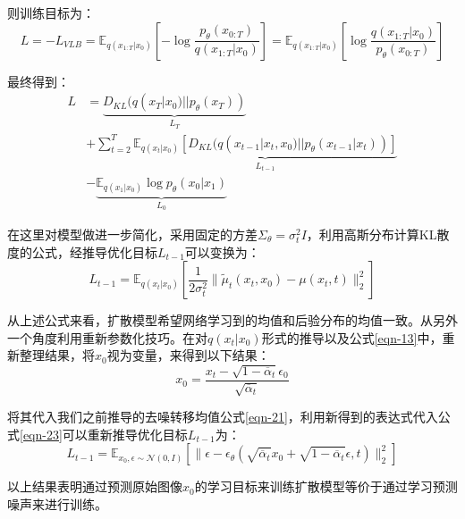 \par
则训练目标为：
\begin{equation}\label{eqn-22}
L = - L_{VLB} = \mathbb{E}_{q(x_{1:T}|x_0)}[-\log{\frac{p_{\theta}(x_{0:T})}{q(x_{1:T}|x_0)}}] = \mathbb{E}_{q(x_{1:T}|x_0)}[\log{\frac{q(x_{1:T}|x_0)}{p_{\theta}(x_{0:T})}}]
\end{equation}
\par
最终得到：
\begin{align}
      L &= \underbrace{D_{KL}(q(x_T|x_0) || p_\theta(x_T))}_{L_T} \nonumber\\
      &+ \sum^T_{t=2}{\underbrace{\mathbb{E}_{q(x_t|x_0)}[D_{KL}(q(x_{t-1}|x_t,x_0) || p_\theta(x_{t-1}|x_t))]}_{L_{t-1}}} \nonumber\\
      &- \underbrace{\mathbb{E}_{q(x_1|x_0)}\log{p_\theta(x_0|x_1)}}_{L_0} \label{eqn-23}
\end{align}
\par
在这里对模型做进一步简化，采用固定的方差$\Sigma_\theta=\sigma^2_tI$，利用高斯分布计算KL散度的公式，经推导优化目标$L_{t-1}$可以变换为：
\begin{equation}\label{eqn-24}
L_{t-1}=\mathbb{E}_{q(x_t|x_0)}[\frac{1}{2\sigma^2_t}\lVert \widetilde{\mu}_t(x_t,x_0)-\mu(x_t,t) \rVert^2_2]
\end{equation}
\par
从上述公式来看，扩散模型希望网络学习到的均值和后验分布的均值一致。从另外一个角度利用重新参数化技巧。在对$q ( x_t | x_0 )$形式的推导以及公式\eqref{eqn-13}中，重新整理结果，将$x_0$视为变量，来得到以下结果：
\begin{equation}\label{eqn-25}
      x_0 = \frac{x_t - \sqrt{1-\overline{\alpha}_t}\epsilon_0}{\sqrt{\overline{\alpha}_t}}
\end{equation}
\par
将其代入我们之前推导的去噪转移均值公式\eqref{eqn-21}，利用新得到的表达式代入公式\eqref{eqn-23}可以重新推导优化目标$L_{t-1}$为：
\begin{equation}\label{eqn-26}
      L_{t-1}=\mathbb{E}_{x_0,\epsilon \sim \mathcal{N}(0,I)}[\lVert \epsilon - \epsilon_\theta (\sqrt{\overline{\alpha}_t}x_0 + \sqrt{1 - \overline{\alpha}_t}\epsilon,t)\rVert^2_2]
\end{equation}
\par
以上结果表明通过预测原始图像$x_0$的学习目标来训练扩散模型等价于通过学习预测噪声来进行训练。
